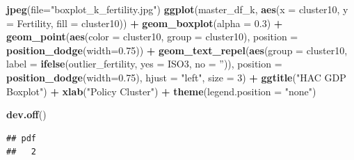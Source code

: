 \documentclass[]{article}
\newenvironment{Shaded}{\begin{snugshade}}{\end{snugshade}}
\newcommand{\DataTypeTok}[1]{\textcolor[rgb]{0.13,0.29,0.53}{#1}}
\newcommand{\DecValTok}[1]{\textcolor[rgb]{0.00,0.00,0.81}{#1}}
\newcommand{\FloatTok}[1]{\textcolor[rgb]{0.00,0.00,0.81}{#1}}
\newcommand{\KeywordTok}[1]{\textcolor[rgb]{0.13,0.29,0.53}{\textbf{#1}}}
\newcommand{\NormalTok}[1]{#1}
\newcommand{\OperatorTok}[1]{\textcolor[rgb]{0.81,0.36,0.00}{\textbf{#1}}}
\newcommand{\StringTok}[1]{\textcolor[rgb]{0.31,0.60,0.02}{#1}}
\begin{document}
\begin{Shaded}
\begin{Highlighting}[]
\KeywordTok{jpeg}\NormalTok{(}\DataTypeTok{file=}\StringTok{"boxplot_k_fertility.jpg"}\NormalTok{)}
\KeywordTok{ggplot}\NormalTok{(master_df_k, }\KeywordTok{aes}\NormalTok{(}\DataTypeTok{x =}\NormalTok{ cluster10, }\DataTypeTok{y =}\NormalTok{ Fertility, }\DataTypeTok{fill =}\NormalTok{ cluster10)) }\OperatorTok{+}
\StringTok{  }\KeywordTok{geom_boxplot}\NormalTok{(}\DataTypeTok{alpha =} \FloatTok{0.3}\NormalTok{) }\OperatorTok{+}
\StringTok{  }\KeywordTok{geom_point}\NormalTok{(}\KeywordTok{aes}\NormalTok{(}\DataTypeTok{color =}\NormalTok{ cluster10, }\DataTypeTok{group =}\NormalTok{ cluster10), }\DataTypeTok{position =} \KeywordTok{position_dodge}\NormalTok{(}\DataTypeTok{width=}\FloatTok{0.75}\NormalTok{)) }\OperatorTok{+}
\StringTok{  }\KeywordTok{geom_text_repel}\NormalTok{(}\KeywordTok{aes}\NormalTok{(}\DataTypeTok{group =}\NormalTok{ cluster10, }
                \DataTypeTok{label =} \KeywordTok{ifelse}\NormalTok{(outlier_fertility,}
                  \DataTypeTok{yes =}\NormalTok{ ISO3,}
                  \DataTypeTok{no =} \StringTok{''}\NormalTok{)), }
            \DataTypeTok{position =} \KeywordTok{position_dodge}\NormalTok{(}\DataTypeTok{width=}\FloatTok{0.75}\NormalTok{),}
            \DataTypeTok{hjust =} \StringTok{"left"}\NormalTok{, }\DataTypeTok{size =} \DecValTok{3}\NormalTok{) }\OperatorTok{+}\StringTok{ }\KeywordTok{ggtitle}\NormalTok{(}\StringTok{"HAC GDP Boxplot"}\NormalTok{) }\OperatorTok{+}\StringTok{ }\KeywordTok{xlab}\NormalTok{(}\StringTok{"Policy Cluster"}\NormalTok{) }\OperatorTok{+}\StringTok{ }
\StringTok{  }\KeywordTok{theme}\NormalTok{(}\DataTypeTok{legend.position =} \StringTok{"none"}\NormalTok{)}

\KeywordTok{dev.off}\NormalTok{()}
\end{Highlighting}
\end{Shaded}

\begin{verbatim}
## pdf 
##   2
\end{verbatim}
\end{document}
